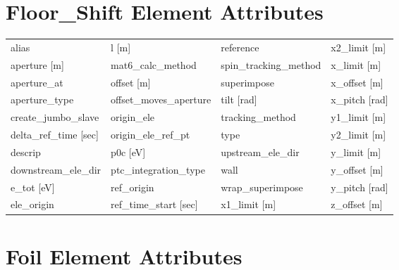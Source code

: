  \section{Floor_Shift Element Attributes}
 \label{s:list.floor.shift}
 
 \begin{tabular}{llll} \toprule
alias                            & l [m]                            & reference                        & x2_limit [m]                     \\
aperture [m]                     & mat6_calc_method                 & spin_tracking_method             & x_limit [m]                      \\
aperture_at                      & offset [m]                       & superimpose                      & x_offset [m]                     \\
aperture_type                    & offset_moves_aperture            & tilt [rad]                       & x_pitch [rad]                    \\
create_jumbo_slave               & origin_ele                       & tracking_method                  & y1_limit [m]                     \\
delta_ref_time [sec]             & origin_ele_ref_pt                & type                             & y2_limit [m]                     \\
descrip                          & p0c [eV]                         & upstream_ele_dir                 & y_limit [m]                      \\
downstream_ele_dir               & ptc_integration_type             & wall                             & y_offset [m]                     \\
e_tot [eV]                       & ref_origin                       & wrap_superimpose                 & y_pitch [rad]                    \\
ele_origin                       & ref_time_start [sec]             & x1_limit [m]                     & z_offset [m]                     \\
 \bottomrule
 \end{tabular}
 \vfill
 
 \section{Foil Element Attributes}
 \label{s:list.foil}
 
